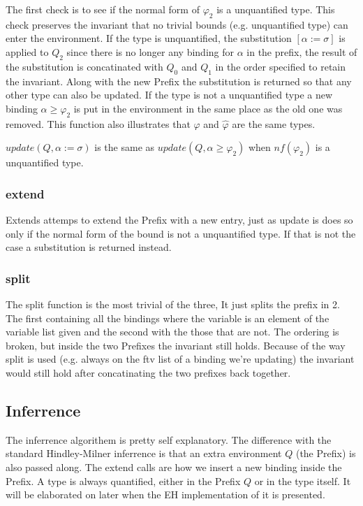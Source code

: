 \documentclass[12pt, a4paper, oneside]{article}
\begin{document}
The first check is to see if the normal form of $\varphi_2$ is a unquantified type. This check preserves the invariant that no trivial bounds (e.g. unquantified type) can enter the environment. If the type is unquantified, the substitution $[\alpha := \sigma]$ is applied to $Q_2$ since there is no longer any binding for $\alpha$ in the prefix, the result of the substitution is concatinated with $Q_0$ and $Q_1$ in the order specified to retain the invariant. Along with the new Prefix the substitution is returned so that any other type can also be updated. If the type is not a unquantified type a new binding $\alpha \geq \varphi_2$ is put in the environment in the same place as the old one was removed. This function also illustrates that $\varphi$ and $\hat{\varphi}$ are the same types.

$update(Q, \alpha := \sigma)$ is the same as $update(Q, \alpha \geq \varphi_2)$ when $nf(\varphi_2)$ is a unquantified type.

\subsubsection{extend}
Extends attemps to extend the Prefix with a new entry, just as update is does so only if the normal form of the bound is not a unquantified type. If that is not the case a substitution is returned instead.

\subsubsection{split}
The split function is the most trivial of the three, It just splits the prefix in 2. The first containing all the bindings where the variable is an element of the variable list given and the second with the those that are not. The ordering is broken, but inside the two Prefixes the invariant still holds. Because of the way split is used (e.g. always on the ftv list of a binding we're updating) the invariant would still hold after concatinating the two prefixes back together.

\subsection{Inferrence}

The inferrence algorithem is pretty self explanatory. The difference with the standard Hindley-Milner inferrence is that an extra environment $Q$ (the Prefix) is also passed along. The extend calls are how we insert a new binding inside the Prefix. A type is always quantified, either in the Prefix $Q$ or in the type itself. It will be elaborated on later when the EH implementation of it is presented.
\end{document}
